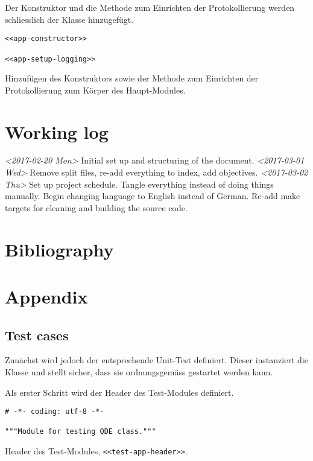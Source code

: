 \documentclass[10pt, openright, notitlepage]{scrreprt}
\begin{document}
Der Konstruktor und die Methode zum Einrichten der Protokollierung werden
schliesslich der Klasse hinzugefügt.

\begin{listing}[H]
\begin{verbatim}
<<app-constructor>>

<<app-setup-logging>>
\end{verbatim}
\caption{\label{org5fdb65c}
Hinzufügen des Konstruktors sowie der Methode zum Einrichten der Protokollierung zum Körper des Haupt-Modules.}
\end{listing}

\chapter{Working log}
\label{sec:org3798818}

\textit{<2017-02-20 Mon> } Initial set up and structuring of the document.
\textit{<2017-03-01 Wed> } Remove split files, re-add everything to index, add objectives.
\textit{<2017-03-02 Thu> } Set up project schedule. Tangle everything instead of doing
                 things manually. Begin changing language to English instead of
                 German. Re-add make targets for cleaning and building the
                 source code.

\chapter{Bibliography}
\label{sec:org779111d}

\printbibliography{}

\chapter{Appendix}
\label{sec:orgd672a36}

\section{Test cases}
\label{sec:org249ed62}

Zunächst wird jedoch der entsprechende Unit-Test definiert. Dieser instanziert
die Klasse und stellt sicher, dass sie ordnungsgemäss gestartet werden kann.

Als erster Schritt wird der Header des Test-Modules definiert.

\begin{listing}[H]
\begin{verbatim}
# -*- coding: utf-8 -*-

"""Module for testing QDE class."""
\end{verbatim}
\caption{\label{org6893ab4}
Header des Test-Modules, \texttt{<<test-app-header>>}.}
\end{listing}
\end{document}

